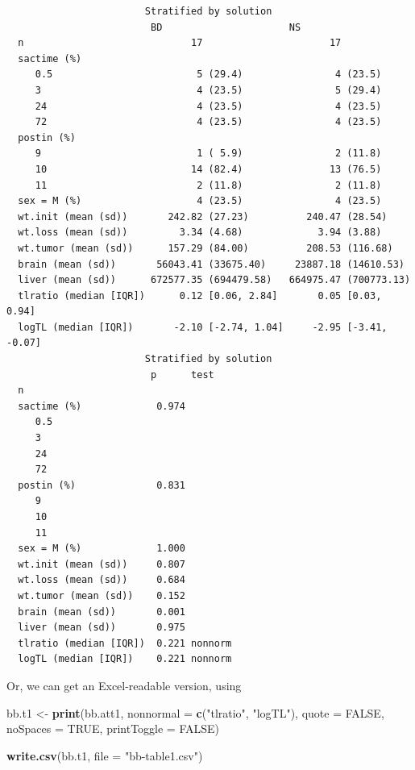 \documentclass[]{book}
\newenvironment{Shaded}{\begin{snugshade}}{\end{snugshade}}
\newcommand{\KeywordTok}[1]{\textcolor[rgb]{0.13,0.29,0.53}{\textbf{#1}}}
\newcommand{\DataTypeTok}[1]{\textcolor[rgb]{0.13,0.29,0.53}{#1}}
\newcommand{\StringTok}[1]{\textcolor[rgb]{0.31,0.60,0.02}{#1}}
\newcommand{\OtherTok}[1]{\textcolor[rgb]{0.56,0.35,0.01}{#1}}
\newcommand{\NormalTok}[1]{#1}
\theoremstyle{definition}
\theoremstyle{definition}
\theoremstyle{definition}
\theoremstyle{remark}
\begin{document}
\begin{verbatim}
                        Stratified by solution
                         BD                      NS                      
  n                             17                      17               
  sactime (%)                                                            
     0.5                         5 (29.4)                4 (23.5)        
     3                           4 (23.5)                5 (29.4)        
     24                          4 (23.5)                4 (23.5)        
     72                          4 (23.5)                4 (23.5)        
  postin (%)                                                             
     9                           1 ( 5.9)                2 (11.8)        
     10                         14 (82.4)               13 (76.5)        
     11                          2 (11.8)                2 (11.8)        
  sex = M (%)                    4 (23.5)                4 (23.5)        
  wt.init (mean (sd))       242.82 (27.23)          240.47 (28.54)       
  wt.loss (mean (sd))         3.34 (4.68)             3.94 (3.88)        
  wt.tumor (mean (sd))      157.29 (84.00)          208.53 (116.68)      
  brain (mean (sd))       56043.41 (33675.40)     23887.18 (14610.53)    
  liver (mean (sd))      672577.35 (694479.58)   664975.47 (700773.13)   
  tlratio (median [IQR])      0.12 [0.06, 2.84]       0.05 [0.03, 0.94]  
  logTL (median [IQR])       -2.10 [-2.74, 1.04]     -2.95 [-3.41, -0.07]
                        Stratified by solution
                         p      test   
  n                                    
  sactime (%)             0.974        
     0.5                               
     3                                 
     24                                
     72                                
  postin (%)              0.831        
     9                                 
     10                                
     11                                
  sex = M (%)             1.000        
  wt.init (mean (sd))     0.807        
  wt.loss (mean (sd))     0.684        
  wt.tumor (mean (sd))    0.152        
  brain (mean (sd))       0.001        
  liver (mean (sd))       0.975        
  tlratio (median [IQR])  0.221 nonnorm
  logTL (median [IQR])    0.221 nonnorm
\end{verbatim}

Or, we can get an Excel-readable version, using

\begin{Shaded}
\begin{Highlighting}[]
\NormalTok{bb.t1 <-}\StringTok{ }\KeywordTok{print}\NormalTok{(bb.att1, }\DataTypeTok{nonnormal =} \KeywordTok{c}\NormalTok{(}\StringTok{"tlratio"}\NormalTok{, }\StringTok{"logTL"}\NormalTok{), }\DataTypeTok{quote =} \OtherTok{FALSE}\NormalTok{,}
               \DataTypeTok{noSpaces =} \OtherTok{TRUE}\NormalTok{, }\DataTypeTok{printToggle =} \OtherTok{FALSE}\NormalTok{)}

\KeywordTok{write.csv}\NormalTok{(bb.t1, }\DataTypeTok{file =} \StringTok{"bb-table1.csv"}\NormalTok{)}
\end{Highlighting}
\end{Shaded}
\end{document}
